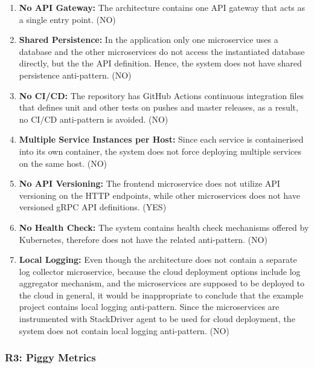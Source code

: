 \documentclass{Configuration_Files/PoliMi3i_thesis}
\begin{document}
\begin{enumerate}
    \item \textbf{No API Gateway:} The architecture contains one API gateway that acts as a single entry point. (NO)
    
    \item \textbf{Shared Persistence:} In the application only one microservice uses a database and the other microservices do not access the instantiated database directly, but the the API definition.
    Hence, the system does not have shared persistence anti-pattern. (NO)
    
    \item \textbf{No CI/CD:} The repository has GitHub Actions continuous integration files that defines unit and other tests on pushes and master releases, as a result, no CI/CD anti-pattern is avoided. (NO)
    
    \item \textbf{Multiple Service Instances per Host:} Since each service is containerised into its own container, the system does not force deploying multiple services on the same host. (NO)
    
    \item \textbf{No API Versioning:} The frontend microservice does not utilize API versioning on the HTTP endpoints, while other microservices does not have versioned gRPC API definitions. (YES)
    
    \item \textbf{No Health Check:} The system contains health check mechanisms offered by Kubernetes, therefore does not have the related anti-pattern. (NO)
    
    \item \textbf{Local Logging:} Even though the architecture does not contain a separate log collector microservice, because the cloud deployment options include log aggregator mechanism, and the microservices are supposed to be deployed to the cloud in general, it would be inappropriate to conclude that the example project contains local logging anti-pattern.
    Since the microservices are instrumented with StackDriver agent to be used for cloud deployment, the system does not contain local logging anti-pattern. (NO)
\end{enumerate}

\subsubsection{R3: Piggy Metrics}
\label{subsubsec:R3}
\end{document}
